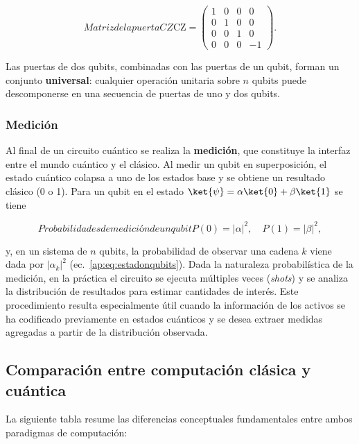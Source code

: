 \begin{equation}{Matriz de la puerta CZ}
\text{CZ} = \begin{pmatrix} 1 & 0 & 0 & 0 \\ 0 & 1 & 0 & 0 \\ 0 & 0 & 1 & 0 \\ 0 & 0 & 0 & -1 \end{pmatrix}.
\end{equation}

Las puertas de dos qubits, combinadas con las puertas de un qubit, forman un conjunto \textbf{universal}: cualquier operación unitaria sobre $n$ qubits puede descomponerse en una secuencia de puertas de uno y dos qubits.

\subsubsection{Medición}
\label{ap:subsubsec:medicion}

Al final de un circuito cuántico se realiza la \textbf{medición}, que constituye la interfaz entre el mundo cuántico y el clásico. Al medir un qubit en superposición, el estado cuántico colapsa a uno de los estados base y se obtiene un resultado clásico (0 o 1). Para un qubit en el estado $\ket{\psi}=\alpha\ket{0}+\beta\ket{1}$ se tiene

\begin{equation}{Probabilidades de medición de un qubit}
P(0)=|\alpha|^2, \quad P(1)=|\beta|^2,
\end{equation}

y, en un sistema de $n$ qubits, la probabilidad de observar una cadena $k$ viene dada por $|{\alpha}_k|^2$ (ec.~\eqref{ap:eq:estadonqubits}). Dada la naturaleza probabilística de la medición, en la práctica el circuito se ejecuta múltiples veces (\textit{shots}) y se analiza la distribución de resultados para estimar cantidades de interés. Este procedimiento resulta especialmente útil cuando la información de los activos se ha codificado previamente en estados cuánticos y se desea extraer medidas agregadas a partir de la distribución observada.

\subsection{Comparación entre computación clásica y cuántica}
\label{ap:subsec:comparacionclasicacuantica}

La siguiente tabla resume las diferencias conceptuales fundamentales entre ambos paradigmas de computación:

